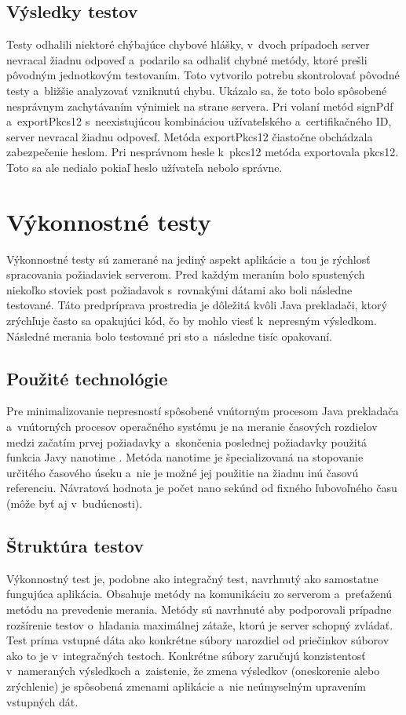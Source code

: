 \documentclass[
  digital, %
  table,   %
oneside,
  nolof,     %
  nolot,     %
]{fithesis3}
\begin{document}
\subsection{Výsledky testov}
Testy odhalili niektoré chýbajúce chybové hlášky, v~dvoch prípadoch server nevracal žiadnu odpoveď a~podarilo sa odhaliť chybné metódy, ktoré prešli pôvodným jednotkovým testovaním.
Toto vytvorilo potrebu skontrolovať pôvodné testy a~bližšie analyzovať vzniknutú chybu. Ukázalo sa, že toto bolo spôsobené nesprávnym zachytávaním výnimiek na strane servera.
Pri volaní metód signPdf a~exportPkcs12 s~neexistujúcou kombináciou užívateľského a~certifikačného ID, server nevracal žiadnu odpoveď. Metóda exportPkcs12 čiastočne obchádzala zabezpečenie heslom. Pri nesprávnom hesle k~pkcs12 metóda exportovala pkcs12. Toto sa ale nedialo pokiaľ heslo užívateľa nebolo správne.
\section{Výkonnostné testy}
Výkonnostné testy sú zamerané na jediný aspekt aplikácie a~tou je rýchlosť spracovania požiadaviek serverom. Pred každým meraním bolo spustených niekoľko stoviek post požiadavok s~rovnakými dátami ako boli následne testované. Táto predpríprava prostredia je dôležitá kvôli Java prekladači, ktorý zrýchľuje často sa opakujúci kód, čo by mohlo viesť k~nepresným výsledkom. Následné merania bolo  testované pri sto a~následne tisíc opakovaní.
\subsection{Použité technológie}
Pre minimalizovanie nepresností spôsobené vnútorným procesom Java prekladača a~vnútorných procesov operačného systému je na meranie časových rozdielov medzi začatím prvej požiadavky a~skončenia poslednej požiadavky použitá funkcia Javy nanotime \cite{systemNanotime}. Metóda nanotime je špecializovaná na stopovanie určitého časového úseku a~nie je možné jej použitie na žiadnu inú časovú referenciu. Návratová hodnota je počet nano sekúnd od fixného ľubovoľného času (môže byť aj v~budúcnosti).
\subsection{Štruktúra testov}
Výkonnostný test je, podobne ako integračný test, navrhnutý ako samostatne fungujúca aplikácia. Obsahuje metódy na komunikáciu zo serverom a~preťaženú metódu na prevedenie merania. Metódy sú navrhnuté aby podporovali prípadne rozšírenie testov o~hľadania maximálnej zátaže, ktorú je server schopný zvládať. Test príma vstupné dáta ako konkrétne súbory narozdiel od priečinkov súborov ako to je v~integračných testoch. Konkrétne súbory zaručujú konzistentosť v~nameraných výsledkoch a~zaistenie, že zmena výsledkov (oneskorenie alebo zrýchlenie) je spôsobená zmenami aplikácie a~nie neúmyselným upravením vstupných dát. \paragraph{}
\end{document}
